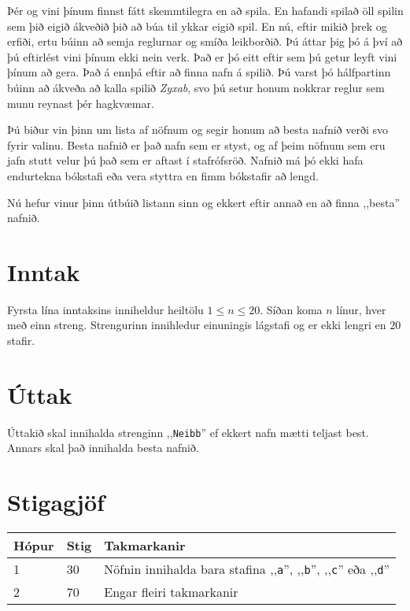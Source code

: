 %
Þér og vini þínum finnst fátt skemmtilegra en að spila.
En hafandi spilað öll spilin sem þið eigið ákveðið þið að búa til ykkar eigið spil.
En nú, eftir mikið þrek og erfiði, ertu búinn að semja reglurnar og smíða leikborðið.
Þú áttar þig þó á því að þú eftirlést vini þínum ekki nein verk.
Það er þó eitt eftir sem þú getur leyft vini þínum að gera.
Það á ennþá eftir að finna nafn á spilið.
Þú varst þó hálfpartinn búinn að ákveða að kalla spilið \emph{Zyxab}, svo þú setur honum nokkrar reglur sem munu reynast þér hagkvæmar.

Þú biður vin þinn um lista af nöfnum og segir honum að besta nafnið verði svo fyrir valinu.
Besta nafnið er það nafn sem er styst, og af þeim nöfnum sem eru jafn stutt velur þú það sem er aftast í stafrófsröð.
Nafnið má þó ekki hafa endurtekna bókstafi eða vera styttra en fimm bókstafir að lengd.

Nú hefur vinur þinn útbúið listann sinn og ekkert eftir annað en að finna ,,besta'' nafnið.

\section*{Inntak}
Fyrsta lína inntaksins inniheldur heiltölu $1 \leq n \leq 20$.
Síðan koma $n$ línur, hver með einn streng.
Strengurinn innihledur einuningis lágstafi og er ekki lengri en $20$ stafir.

\section*{Úttak}
Úttakið skal innihalda strenginn ,,\texttt{Neibb}'' ef ekkert nafn mætti teljast best.
Annars skal það innihalda besta nafnið.

\section*{Stigagjöf}
\begin{tabular}{|l|l|l|}
\hline
Hópur & Stig & Takmarkanir \\ \hline
1     & 30   & Nöfnin innihalda bara stafina ,,\texttt{a}'', ,,\texttt{b}'', ,,\texttt{c}'' eða ,,\texttt{d}'' \\ \hline
2     & 70   & Engar fleiri takmarkanir \\ \hline
\end{tabular}
